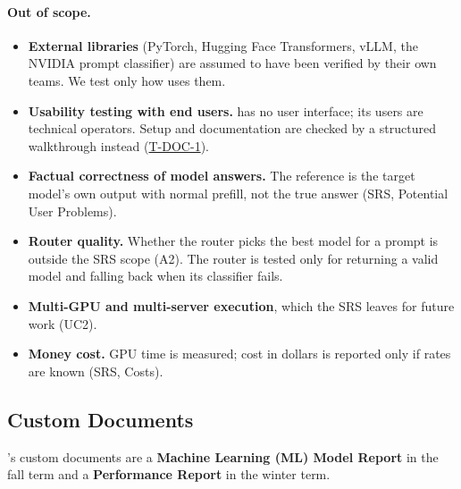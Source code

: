 \documentclass[12pt, titlepage]{article}
\newcommand{\tref}[1]{\hyperref[test:#1]{#1}}
\begin{document}
\paragraph{Out of scope.}
\begin{itemize}
  \item \textbf{External libraries} (PyTorch, Hugging Face Transformers,
  vLLM, the NVIDIA prompt classifier) are assumed to have been verified by
  their own teams. We test only how \progname{} uses them.
  \item \textbf{Usability testing with end users.} \progname{} has no user
  interface; its users are technical operators. Setup and documentation are
  checked by a structured walkthrough instead (\tref{T-DOC-1}).
  \item \textbf{Factual correctness of model answers.} The reference is the
  target model's own output with normal prefill, not the true answer
  (SRS, Potential User Problems).
  \item \textbf{Router quality.} Whether the router picks the best model for
  a prompt is outside the SRS scope (A2). The router is tested only for
  returning a valid model and falling back when its classifier fails.
  \item \textbf{Multi-GPU and multi-server execution}, which the SRS leaves
  for future work (UC2).
  \item \textbf{Money cost.} GPU time is measured; cost in dollars is
  reported only if rates are known (SRS, Costs).
\end{itemize}

\subsection{Custom Documents}

\progname{}'s custom documents are a \textbf{Machine Learning (ML) Model
Report} in the fall term and a \textbf{Performance Report} in the winter
term.
\end{document}
